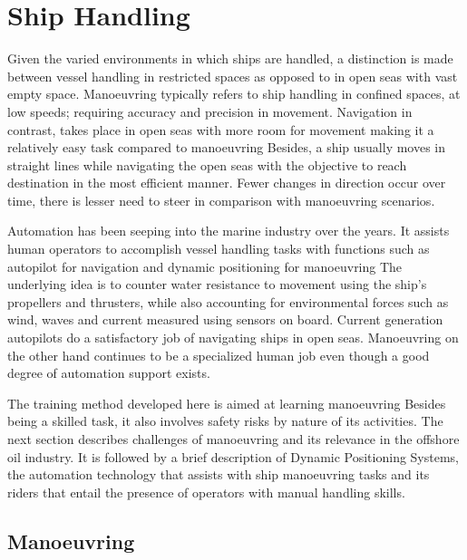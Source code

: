 \section{Ship Handling}

Given the varied environments in which ships are handled, a distinction is made between vessel handling in restricted spaces as opposed to in open seas with vast empty space. Manoeuvring typically refers to ship handling in confined spaces, at low speeds; requiring accuracy and precision in movement. Navigation in contrast, takes place in open seas with more room for movement making it a relatively easy task compared to manoeuvring Besides, a ship usually moves in straight lines while navigating the open seas with the objective to reach destination in the most efficient manner. Fewer changes in direction occur over time, there is lesser need to steer in comparison with manoeuvring scenarios. 

Automation has been seeping into the marine industry over the years. It assists human operators to accomplish vessel handling tasks with functions such as autopilot for navigation and dynamic positioning for manoeuvring The underlying idea is to counter water resistance to movement using the ship's propellers and thrusters, while also accounting for environmental forces such as wind, waves and current measured using sensors on board. Current generation autopilots do a satisfactory job of navigating ships in open seas. Manoeuvring on the other hand continues to be a specialized human job even though a good degree of automation support exists.


The training method developed here is aimed at learning manoeuvring Besides being a skilled task, it also involves safety risks by nature of its activities. The next section describes challenges of manoeuvring and its relevance in the offshore oil industry. It is followed by a brief description of Dynamic Positioning Systems, the automation technology that assists with ship manoeuvring tasks and its riders that entail the presence of operators with manual handling skills. 

\subsection{Manoeuvring}

